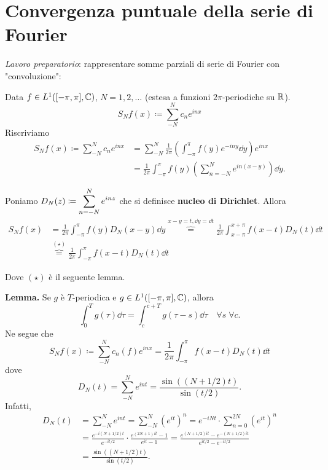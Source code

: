 \section{Convergenza puntuale della serie di Fourier}


\textit{Lavoro preparatorio}: rappresentare somme parziali di serie di Fourier con "convoluzione":

Data $f \in L^1([-\pi,\pi], \mathbb C) $, $N = 1,2,\ldots$ (estesa a funzioni $2\pi$-periodiche su $\mathbb R$).
%
$$
S_N f(x) \coloneqq \sum_{-N}^N c_n e^{inx}  
$$
%
Riscriviamo
%
\begin{align*}
	S_N f(x) \coloneqq \sum_{-N}^N c_n e^{inx} 
	& = \sum_{-N}^N \frac{1}{2\pi} \left( \int_{-\pi}^\pi f(y) e^{-iny} \dd y \right) e^{inx} \\
	& = \frac{1}{2\pi} \int_{-\pi}^\pi f(y) \left( \sum_{n=-N}^{N} e^{in(x-y)}  \right) \dd y.
\end{align*}

Poniamo $\displaystyle D_N(z) \coloneqq \sum_{n=-N}^{N} e^{inz} $ che si definisce \textbf{nucleo di Dirichlet}. Allora
%
\begin{align*}
	S_N f(x) & = \frac{1}{2\pi} \int_{-\pi}^\pi f(y) D_N(x-y) \dd y \overbrace{=}^{x-y=t, \dd y = \dd t} \frac{1}{2\pi} \int_{x-\pi}^{x+\pi} f(x-t) D_N(t) \dd t \\
	& \overbrace{=}^{(\star)} \frac{1}{2\pi} \int_{-\pi}^\pi f(x-t) D_N(t) \dd t 
\end{align*}

Dove $(\star)$ è il seguente lemma.

\textbf{Lemma.} Se $g$ è $T$-periodica e $g \in L^1([-\pi,\pi], \mathbb C) $, allora
%
$$
	\int_0^T g(\tau) \dd \tau = \int_c^{c+T} g(\tau-s) \dd \tau \quad \forall s \; \forall c.
$$
%
Ne segue che
%
$$
	S_N f(x) \coloneqq \sum_{-N}^{N} c_n(f) e^{inx} = \frac{1}{2\pi} \int_{-\pi}^\pi f(x-t) D_N(t) \dd t 
$$
%
dove
%
$$
	D_N(t) = \sum_{-N}^{N} e^{int} = \frac{\sin( (N+ 1/2)t)}{\sin(t/2)}.
$$
%
Infatti,
%
\begin{align*}
	D_N(t) & = \sum_{-N}^N e^{int} = \sum_{-N}^N ( e^{it} )^n = e^{-iNt} \cdot \sum_{n=0}^{2N} ( e^{it} )^n \\
	& = \frac{e^{-i(N + 1/2)t}}{e^{-i t/2}} \cdot \frac{e^{(2N+1) it} - 1}{e^{it} - 1} = \frac{e^{(N+1/2)it} - e^{-(N+1/2)it}}{e^{i t/2} - e^{-i t/2}} \\
	& = \frac{\sin ( (N+1/2)t)}{\sin(t/2)}.
\end{align*}

